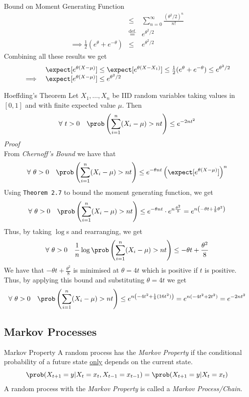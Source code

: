 \documentclass[11pt,a4paper]{article}
\begin{document}
\begin{theorem}{Bound on Moment Generating Function}
\[\begin{array}{rclll}
    &\leq&\displaystyle\sum_{n=0}^\infty\frac{(\theta^2/2)^n}{n!}\\
    &\overset{\text{def.}}{=}&e^{\theta^2/2}\\
    \implies\frac12(e^\theta+e^{-\theta})&\leq&e^{\theta^2/2}
    \end{array}\]
    Combining all these results we get
    \[ \begin{array}{rl}
    &\expect[e^{\theta(X-\mu)}]\leq\expect[e^{\theta(X-X_1)}]\leq\frac12(e^\theta+e^{-\theta})\leq e^{\theta^2/2}\\
    \implies&\expect[e^{\theta(X-\mu)}]\leq e^{\theta^2/2}
    \end{array}\]
    \proved
  \end{theorem}

  \begin{theorem}{Hoeffding's Theorem}
    Let $X_1,\dots,X_n$ be IID random variables taking values in $[0,1]$ and with finite expected value $\mu$. Then
    \[ \forall\ t>0\quad\prob\left(\sum_{i=1}^n(X_i-\mu)>nt\right)\leq e^{-2nt^2} \]
    \textit{Proof}\\
    From \textit{Chernoff's Bound} we have that
    \[ \forall\ \theta>0\quad\prob\left(\sum_{i=1}^n(X_i-\mu)>nt\right)\leq e^{-\theta nt}\left(\expect[e^{\theta(X-\mu)}]\right)^n \]
    Using \texttt{Theorem 2.7} to bound the moment generating function, we get
    \[ \forall\ \theta>0\quad\prob\left(\sum_{i=1}^n(X_i-\mu)>nt\right)\leq e^{-\theta nt}\cdot e^{n\frac{\theta^2}8}=e^{n\left(-\theta t+\frac{1}8\theta^2\right)} \]
    Thus, by taking $\log$s and rearranging, we get
    \[ \forall\ \theta>0\quad\frac1n\log\prob\left(\sum_{i=1}^n(X_i-\mu)>nt\right)\leq-\theta t+\frac{\theta^2}8 \]
    We have that $-\theta t+\frac{\theta^2}8$ is minimised at $\theta=4t$ which is positive if $t$ is positive. Thus, by applying this bound and substituting $\theta=4t$ we get
    \[ \forall\ \theta>0\quad\prob\left(\sum_{i=1}^n(X_i-\mu)>nt\right)\leq e^{n\left(-4t^2+\frac{1}8(16t^2)\right)}=e^{n(-4t^2+2t^2)}=e^{-2nt^2} \]
    \proved
  \end{theorem}

\subsection{Markov Processes}

  \begin{definition}{Markov Property}
    A random process has the \textit{Markov Property} if the conditional probability of a future state \underline{only} depends on the current state.
    \[ \prob(X_{t+1}=y|X_{t}=x_t,X_{t-1}=x_{t-1})=\prob(X_{t+1}=y|X_t=x_t) \]
    A random process with the \textit{Markov Property} is called a \textit{Markov Process/Chain}.
  \end{definition}
\end{document}
